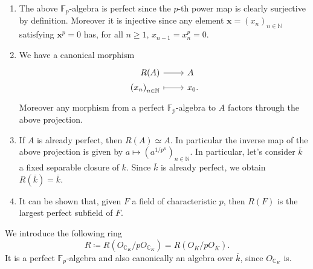 \begin{rem}[]\leavevmode\vspace{-.2\baselineskip}
\begin{enumerate}
\item The above $\mathbb{F}_p$-algebra is perfect
	since the $p$-th power map is clearly surjective by definition.
	Moreover it is injective since any element $\mathbf{x} = \left( x_n \right)_{n \in \mathbb{N}}$
	satisfying $\mathbf{x}^p = 0$ has, for all $n \geq 1$,
	$x_{n-1} = x_n^p = 0$.

\item We have a canonical morphism
	\begin{equation*}
	\begin{tikzcd}[row sep = 0ex
		,/tikz/column 1/.append style={anchor=base east}
		,/tikz/column 2/.append style={anchor=base west}]
		R(A) \arrow[r, "", rightarrow] &
		A \\
		\left( x_n \right)_{n \in \mathbb{N}} \arrow[r, "", mapsto] & 
		x_0
	.\end{tikzcd}
	\end{equation*} 
	Moreover any morphism from a perfect $\mathbb{F}_p$-algebra
	to $A$ factors through the above projection.

\item If $A$ is already perfect, then $R(A) \simeq A$.
	In particular the inverse map of the above projection is given by
	$a \mapsto \left( a^{1/p^n} \right)_{n \in \mathbb{N}}$.
	In particular, let's consider $\overline{k}$ a fixed separable closure of $k$.
	Since $\overline{k}$ is already perfect, we obtain $R(\overline{k}) = \overline{k}$.

\item It can be shown that, given $F$ a field of characteristic $p$, then $R(F)$ is the largest
	perfect subfield of $F$.
\end{enumerate}
\end{rem}


\begin{ntt}[]
	We introduce the following ring
	\begin{equation*}
		R \coloneqq R(O_{\mathbb{C}_K}/pO_{\mathbb{C}_K}) =
		R(O_{\overline{K}}/pO_{\overline{K}})
	.\end{equation*}
	It is a perfect $\mathbb{F}_p$-algebra and also canonically an
	algebra over $\overline{k}$, since $O_{\mathbb{C}_K}$ is.
\end{ntt}


